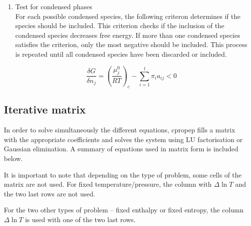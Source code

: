 \documentclass[10pt]{article}
\begin{document}
\begin{enumerate}
\item Test for condensed phases\\
	For each possible condensed species, the following criteron
determines if the species should be included. This criterion checks if the
inclusion of the condensed species decreases free energy. If more than one
condensed species satisfies the criterion, only the most negative should be
included. This process is repeated until all condensed species have been
discarded or included.

$$\frac{\delta{G}}{\delta{n_j}}=\left( \frac{\mu_j^0}{RT}\right)_c -
\sum_{i=1}^{l}{\pi_i a_{ij}} < 0$$


\end{enumerate}

\subsection{Iterative matrix}

In order to solve simultaneously the different equations, cpropep fills
a matrix with the appropriate coefficients and solves the system using
LU factorisation or Gaussian elimination.  A summary of equations used
in matrix form is included below.

It is important to note that depending on the type of problem, some
cells of the matrix are not used. For fixed temperature/pressure, the column with
$\Delta \ln{T}$ and the two last rows are not used.

For the two other types of problem -- fixed enthalpy or fixed entropy,
the column $\Delta \ln{T}$ is used with one of the two last rows. 


\end{document}

